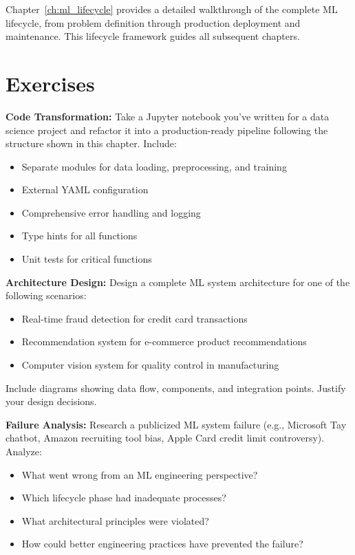 Chapter~\ref{ch:ml_lifecycle} provides a detailed walkthrough of the complete ML lifecycle, from problem definition through production deployment and maintenance. This lifecycle framework guides all subsequent chapters.

\section{Exercises}

\begin{exercise}
\textbf{Code Transformation:} Take a Jupyter notebook you've written for a data science project and refactor it into a production-ready pipeline following the structure shown in this chapter. Include:
\begin{itemize}
    \item Separate modules for data loading, preprocessing, and training
    \item External YAML configuration
    \item Comprehensive error handling and logging
    \item Type hints for all functions
    \item Unit tests for critical functions
\end{itemize}
\end{exercise}

\begin{exercise}
\textbf{Architecture Design:} Design a complete ML system architecture for one of the following scenarios:
\begin{itemize}
    \item Real-time fraud detection for credit card transactions
    \item Recommendation system for e-commerce product recommendations
    \item Computer vision system for quality control in manufacturing
\end{itemize}
Include diagrams showing data flow, components, and integration points. Justify your design decisions.
\end{exercise}

\begin{exercise}
\textbf{Failure Analysis:} Research a publicized ML system failure (e.g., Microsoft Tay chatbot, Amazon recruiting tool bias, Apple Card credit limit controversy). Analyze:
\begin{itemize}
    \item What went wrong from an ML engineering perspective?
    \item Which lifecycle phase had inadequate processes?
    \item What architectural principles were violated?
    \item How could better engineering practices have prevented the failure?
\end{itemize}
\end{exercise}

